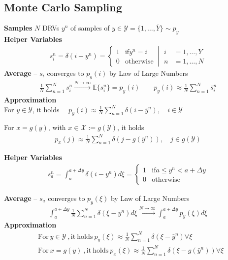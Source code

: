 \subsection{Monte Carlo Sampling}
\textbf{Samples} $N$ DRVs $y^n$ of samples of $y\in\mathcal{Y}=\{1,\dots,\bar{Y}\} \sim p_y$\\
\textbf{Helper Variables}
\begin{align*}
    \left.
    s_i^n = \delta(i-y^n) = 
    \begin{cases}
        1 & \mathrm{if } y^n=i \\
        0 & \mathrm{otherwise}
    \end{cases}
    \ \right\rvert \
    \begin{aligned}
        i &= 1,\dots, \bar{Y} \\
        n &= 1,\dots, N
    \end{aligned}
\end{align*}
\textbf{Average} -- $s_i$ converges to $p_y(i)$ by Law of Large Numbers
\begin{align*}
    \frac{1}{N} \sum_{n=1}^{N} s_i^n 
    \xrightarrow{N\to\infty} \mathbb{E}\{s_i^n\} = p_y(i)
    \qquad 
    p_y(i) \approx \frac{1}{N} \sum_{n=1}^{N}\bar{s}_i^n
\end{align*}
\textbf{Approximation}\\
For $y\in\mathcal{Y}$, it holds 
$\quad p_y(i) \approx \textstyle\frac{1}{N}\sum_{n=1}^{N}
\delta(i-\bar{y}^n), 
\quad i \in \mathcal{Y}$

For $x=g(y)$, with $x\in\mathcal{X} := g(\mathcal{Y})$, it holds
\begin{align*}
    p_x(j) \approx \frac{1}{N}\sum_{n=1}^{N}
    \delta(j-g(\bar{y}^n)), 
    \quad j \in g(\mathcal{Y})
\end{align*}

\textbf{Helper Variables}
\begin{align*}
    s_a^n = \textstyle\int_{a}^{a+\Delta y} \delta(i-y^n) d\xi = 
    \begin{cases}
        1 & \mathrm{if } a \leq y^n < a + \Delta y \\
        0 & \mathrm{otherwise}
    \end{cases}
\end{align*}

\textbf{Average} -- $s_a$ converges to $p_y(\xi)$ by Law of Large Numbers
\begin{align*}
    \textstyle\int_{a}^{a+\Delta y}\frac{1}{N} \sum_{n=1}^{N} \delta(\xi-y^n)d\xi
    \xrightarrow{N\to\infty}
    \textstyle\int_{a}^{a+\Delta y} p_y(\xi)d\xi
\end{align*}
\textbf{Approximation}
\begin{align*}
    &\mathrm{For } \ y\in\mathcal{Y} \ \mathrm{, it \ holds} \ p_y(\xi) \approx \frac{1}{N}\sum_{n=1}^{N}\delta(\xi-\bar{y}^n) \forall\xi \\
    &\mathrm{For } \ x=g(y) \ \mathrm{, it \ holds} \ p_x(\xi) \approx \frac{1}{N}\sum_{n=1}^{N}\delta(\xi-g(\bar{y}^n)) \forall\xi
\end{align*}